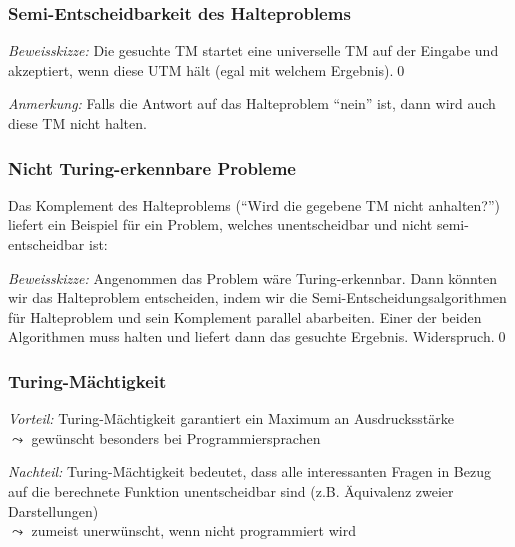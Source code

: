 \documentclass[onlymath]{beamer}
\begin{document}
\begin{frame}\frametitle{Semi-Entscheidbarkeit des Halteproblems}


\emph{Beweisskizze:} Die gesuchte TM startet eine universelle TM auf der Eingabe 
und akzeptiert, wenn diese UTM hält (egal mit welchem Ergebnis).\qed

\bigskip
\emph{Anmerkung:} Falls die Antwort auf das Halteproblem "`nein"' ist, dann wird auch diese
TM nicht halten.

\end{frame}

\begin{frame}\frametitle{Nicht Turing-erkennbare Probleme}

Das Komplement des Halteproblems ("`Wird die gegebene TM nicht anhalten?"') liefert 
ein Beispiel für ein Problem, welches unentscheidbar und nicht semi-entscheidbar ist:
\medskip


\emph{Beweisskizze:} Angenommen das Problem wäre Turing-erkennbar.
Dann könnten wir
das Halteproblem entscheiden, indem wir die Semi-Entscheidungsalgorithmen für Halteproblem
und sein Komplement parallel abarbeiten. Einer der beiden Algorithmen muss halten und liefert
dann das gesuchte Ergebnis. Widerspruch.\qed

\end{frame}

\begin{frame}\frametitle{Turing-Mächtigkeit}

\bigskip

\emph{Vorteil:} Turing-Mächtigkeit garantiert ein Maximum an Ausdrucksstärke\\
$\leadsto$ gewünscht besonders bei Programmiersprachen
\bigskip

\emph{Nachteil:} Turing-Mächtigkeit bedeutet, dass alle interessanten Fragen in Bezug auf die berechnete Funktion unentscheidbar sind (z.B. Äquivalenz zweier Darstellungen) \\
$\leadsto$ zumeist unerwünscht, wenn nicht programmiert wird

\end{frame}
\end{document}
